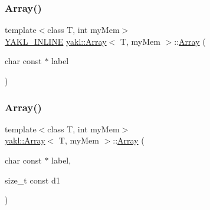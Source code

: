 \mbox{\label{classyakl_1_1Array_aad1f943d071f33a58d24a2620430371a}} 
\subsubsection{\texorpdfstring{Array()}{Array()}\hspace{0.1cm}{\footnotesize\ttfamily [2/12]}}
{\footnotesize\ttfamily template$<$class T, int my\+Mem$>$ \\
\hyperlink{YAKL_8h_aa0dd629ffce6d564b19e9313fb91a5ad}{Y\+A\+K\+L\+\_\+\+I\+N\+L\+I\+NE} \hyperlink{classyakl_1_1Array}{yakl\+::\+Array}$<$ T, my\+Mem $>$\+::\hyperlink{classyakl_1_1Array}{Array} (\begin{DoxyParamCaption}\item[{char const $\ast$}]{label }\end{DoxyParamCaption})\hspace{0.3cm}{\ttfamily [inline]}}

\mbox{\label{classyakl_1_1Array_aa9ffb0eb2d37a3e00e9736106d389bc9}} 
\subsubsection{\texorpdfstring{Array()}{Array()}\hspace{0.1cm}{\footnotesize\ttfamily [3/12]}}
{\footnotesize\ttfamily template$<$class T, int my\+Mem$>$ \\
\hyperlink{classyakl_1_1Array}{yakl\+::\+Array}$<$ T, my\+Mem $>$\+::\hyperlink{classyakl_1_1Array}{Array} (\begin{DoxyParamCaption}\item[{char const $\ast$}]{label,  }\item[{size\+\_\+t const}]{d1 }\end{DoxyParamCaption})\hspace{0.3cm}{\ttfamily [inline]}}

\mbox{\label{classyakl_1_1Array_ab60017090aff5ecb1538dfaebfb41e89}} 
